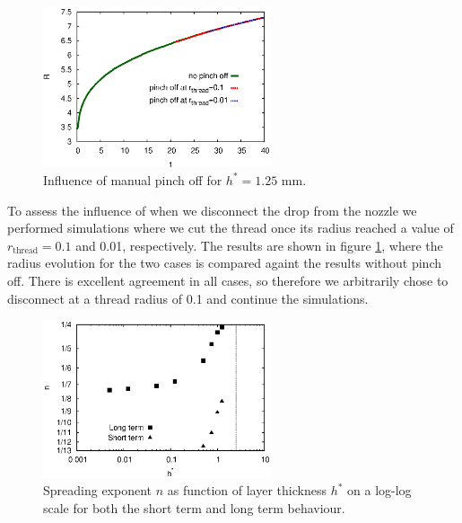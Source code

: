 \documentclass[aip,graphicx]{revtex4-1}
\newcommand{\sym}[1]{\text{#1}}
\begin{document}
\begin{figure}[!ht]
\centering
\includegraphics[width=0.6\textwidth]{figures/radius_vs_time_influence_pinch_off.eps}
\caption{Influence of manual pinch off for $h^*=1.25$ mm.}
\label{fig:radius_vs_time_influence_pinch_off}
\end{figure}

To assess the influence of when we disconnect the drop from the nozzle we performed simulations where we cut the thread once its radius reached a value of $r_{\sym{thread}}=0.1$ and 0.01, respectively.
The results are shown in figure \ref{fig:radius_vs_time_influence_pinch_off}, where the radius evolution for the two cases is compared againt the results without pinch off.
There is excellent agreement in all cases, so therefore we arbitrarily chose to disconnect at a thread radius of 0.1 and continue the simulations. \\

\begin{figure}[!ht]
\centering
\includegraphics[width=0.6\textwidth]{figures/scaling_vs_layer_inc_short_time.eps}
\caption{Spreading exponent $n$ as function of layer thickness $h^*$ on a log-log scale for both the short term and long term behaviour.}
\label{fig:scaling_vs_layer}
\end{figure}
\end{document}
